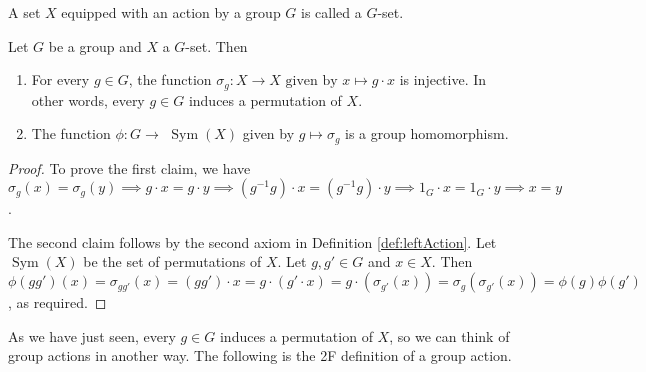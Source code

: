 \begin{definition}
    A set $X$ equipped with an action by a group $G$ is called a $G$-set.
\end{definition}



\begin{theorem}
  Let $G$ be a group and $X$ a $G$-set. Then
  \begin{enumerate}
    \item For every $g\in G$, the function $\sigma_g:X\to X \text{ given by } x\mapsto g\cdot x$ is
      injective. In other words, every $g\in G$ induces a permutation of $X$.
    \item The function $\phi :G\to $ $\operatorname{Sym}(X)$ given by $g\mapsto\sigma_g$ is a group homomorphism.
  \end{enumerate}
  \label{<+label+>}
\end{theorem}
\begin{proof}
  To prove the first claim, we have $\sigma_g(x) = \sigma_g(y )\implies g\cdot x= g\cdot y
  \implies (g^{-1}g)\cdot x = (g^{-1}g)\cdot y \implies 1_G\cdot x = 1_G\cdot y \implies
  x=y$.
  
  The second claim follows by the second axiom in Definition \ref   {def:leftAction}. Let
  $\operatorname{Sym}(X)$ be the set of permutations of $X$. Let $g,g'\in G$ and $x \in X$.
  Then $\phi(gg')(x) = \sigma_{gg'}(x)= (gg')\cdot x = 
  g \cdot (g' \cdot x) = g \cdot (\sigma_{g'}(x)) = \sigma_g(\sigma_{g'}(x)) = \phi(g)\phi(g')$,
  as required.
\end{proof}

As we have just seen, every $g\in G$ induces a permutation of $X$, so we can think of group actions in another way. The following is the 2F definition of a group action.

